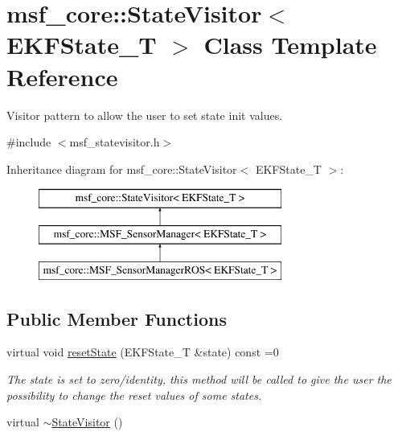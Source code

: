 \hypertarget{classmsf__core_1_1StateVisitor}{\section{msf\-\_\-core\-:\-:State\-Visitor$<$ E\-K\-F\-State\-\_\-\-T $>$ Class Template Reference}
\label{classmsf__core_1_1StateVisitor}
}


Visitor pattern to allow the user to set state init values.  




{\ttfamily \#include $<$msf\-\_\-statevisitor.\-h$>$}

Inheritance diagram for msf\-\_\-core\-:\-:State\-Visitor$<$ E\-K\-F\-State\-\_\-\-T $>$\-:\begin{figure}[H]
\begin{center}
\leavevmode
\includegraphics[height=3.000000cm]{classmsf__core_1_1StateVisitor}
\end{center}
\end{figure}
\subsection*{Public Member Functions}
\begin{DoxyCompactItemize}
\item 
virtual void \hyperlink{classmsf__core_1_1StateVisitor_a42a37cdfe7b7c4aa5d3c9f5f661ab581}{reset\-State} (E\-K\-F\-State\-\_\-\-T \&state) const =0
\begin{DoxyCompactList}\small\item\em The state is set to zero/identity, this method will be called to give the user the possibility to change the reset values of some states. \end{DoxyCompactList}\item 
virtual \hyperlink{classmsf__core_1_1StateVisitor_a863a6d8b72e9f8767a76c8c2e7daabba}{$\sim$\-State\-Visitor} ()
\end{DoxyCompactItemize}


